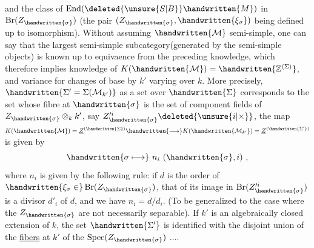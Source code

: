 and the class of $\operatorname{End}(\deleted{\unsure{S|B}}\handwritten{M})$ in $\operatorname{Br}(Z_{\handwritten{\sigma}})$ (the pair $(Z_{\handwritten{\sigma}},\handwritten{\xi_\sigma})$ being defined up to isomorphism). Without assuming $\handwritten{\mathcal{M}}$ semi\handwritten{\unsure{(}}-simple, one can say that the largest semi-simple subcategory(generated by the semi-simple objects) is known up to equivaence from the preceding knowledge, which therefore implies knowledge of $K(\handwritten{\mathcal{M}})=\handwritten{\mathbb{Z}^{(\Sigma)}}$, and  variance for  changes of base by $k'$ varying over $k$. More precisely,$\handwritten{\Sigma'=\Sigma(\mathcal{M}_{k'})}$ as a set over $\handwritten{\Sigma}$ corresponds to the set  whose fibre  at $\handwritten{\sigma}$ is the set of component fields of $Z_{\handwritten{\sigma}}\otimes_k k'$, say $Z'^{i}_{\handwritten{\sigma}}\deleted{\unsure{i|\times}}$, the map $K(\handwritten{\mathcal{M}})=\underline{Z}^{(\handwritten{\Sigma})}\handwritten{\longrightarrow}K(\handwritten{\mathcal{M}_{k'}})=\underline{Z}^{(\handwritten{\Sigma'})}$ is given by
\[
\handwritten{\sigma\longmapsto}\ n_i\ (\handwritten{\sigma},i)\ ,
\]
where $n_i$ is given by the following rule: if $d$ is  the order of $\handwritten{\xi_\sigma\in}\operatorname{Br}(Z_{\handwritten{\sigma}})$, that of its image in $\operatorname{Br}(Z'^{i}_{\handwritten{\sigma}})$ is a  divisor $d'_i$ of $d$, and we have $n_i=d/d_i$. (To be generalized to the case where the $Z_{\handwritten{\sigma}}$ are not necessarily separable). If $k'$ is an  algebraically closed extension of $k$, the set $\handwritten{\Sigma'}$ is identified with the disjoint union of the \uline{fibers} at $k'$ of the $\operatorname{Spec}(Z_{\handwritten{\sigma}})$ ....


